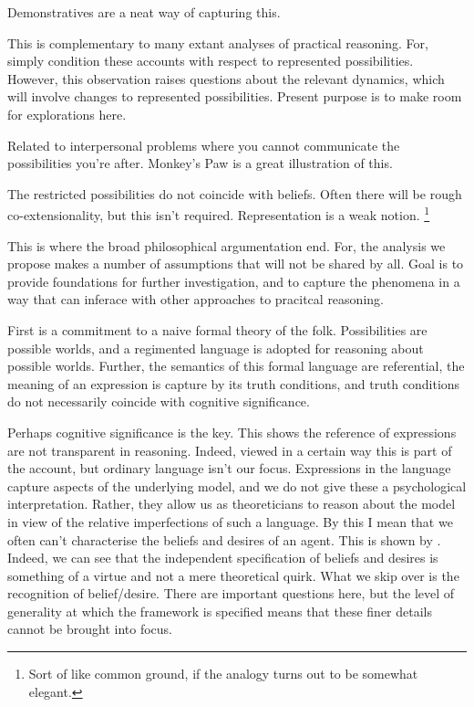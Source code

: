 \documentclass[10pt]{article}
\begin{document}
Demonstratives are a neat way of capturing this.

This is complementary to many extant analyses of practical reasoning.
For, simply condition these accounts with respect to represented possibilities.
However, this observation raises questions about the relevant dynamics, which will involve changes to represented possibilities.
Present purpose is to make room for explorations here.

Related to interpersonal problems where you cannot communicate the possibilities you're after.
Monkey's Paw is a great illustration of this.

The restricted possibilities do not coincide with beliefs.
Often there will be rough co-extensionality, but this isn't required.
Representation is a weak notion.\nolinebreak
\footnote{Sort of like common ground, if the analogy turns out to be somewhat elegant.}


This is where the broad philosophical argumentation end.
For, the analysis we propose makes a number of assumptions that will not be shared by all.
Goal is to provide foundations for further investigation, and to capture the phenomena in a way that can inferace with other approaches to pracitcal reasoning.

First is a commitment to a naive formal theory of the folk.
Possibilities are possible worlds, and a regimented language is adopted for reasoning about possible worlds.
Further, the semantics of this formal language are referential, the meaning of an expression is capture by its truth conditions, and truth conditions do not necessarily coincide with cognitive significance.

Perhaps cognitive significance is the key.
This shows the reference of expressions are not transparent in reasoning.
Indeed, viewed in a certain way this is part of the account, but ordinary language isn't our focus.
Expressions in the language capture aspects of the underlying model, and we do not give these a psychological interpretation.
Rather, they allow us as theoreticians to reason about the model in view of the relative imperfections of such a language.
By this I mean that we often can't characterise the beliefs and desires of an agent.
This is shown by \citeauthor{Humberstone:2013aa}.
Indeed, we can see that the independent specification of beliefs and desires is something of a virtue and not a mere theoretical quirk.
What we skip over is the recognition of belief/desire.
There are important questions here, but the level of generality at which the framework is specified means that these finer details cannot be brought into focus.
\end{document}
